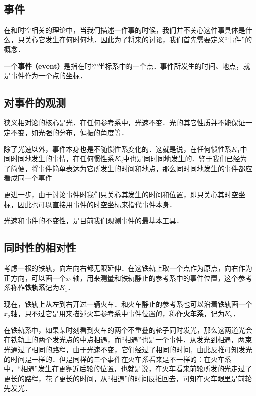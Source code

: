 

\subsection{事件}

在和时空相关的理论中，当我们描述一件事的时候，我们并不关心这件事具体是什么，只关心它发生在何时何地．因此为了将来的讨论，我们首先需要定义“事件”的概念．

一个\textbf{事件（event）}是指在时空坐标系中的一个点．事件所发生的时间、地点，就是事件作为一个点的坐标．

\subsection{对事件的观测}

狭义相对论的核心是光．在任何参考系中，光速不变．光的其它性质并不能保证一定不变，如光强的分布，偏振的角度等．

除了光速以外，事件本身也是不随惯性系变化的．这就是说，在任何惯性系$K_1$中同时同地发生的事情，在任何惯性系$K_2$中也是同时同地发生的．鉴于我们已经为了简便，将事件简单表达为它所发生的时间和地点，那么同时同地发生的事件都应看成同一个事件．

更进一步，由于讨论事件时我们只关心其发生的时间和位置，即只关心其时空坐标，因此也可以直接用事件的时空坐标来指代事件本身．

光速和事件的不变性，是目前我们观测事件的最基本工具．

\subsection{同时性的相对性}

考虑一根的铁轨，向左向右都无限延伸．在这铁轨上取一个点作为原点，向右作为正方向，可以画一个$x_1$轴，用来测量和铁轨静止的参考系中的事件位置，这个参考系称作\textbf{铁轨系}记为$K_1$．

现在，铁轨上从左到右开过一辆火车．和火车静止的参考系也可以沿着铁轨画一个$x_2$轴，只不过它是用来描述火车参考系中事件位置的，称作\textbf{火车系}，记为$K_2$．

在铁轨系中，如果某时刻看到火车的两个不重叠的轮子同时发光，那么这两道光会在铁轨上的两个发光点的中点相遇，而“相遇”也是一个事件．从发光到相遇，两束光通过了相同的路程，由于光速不变，它们经过了相同的时间，由此反推可知发光的时间是一样的．但是同样的三个事件在火车系看来是不一样的：在火车系中，“相遇”发生在更靠近后轮的位置，也就是说，在火车看来前轮所发的光走过了更长的路程，花了更长的时间，从“相遇”的时间反推回去，可知在火车眼里是前轮先发光．

